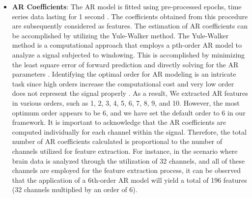 \begin{itemize}
\item \textbf{\large AR Coefficients}: 
The AR model is fitted using pre-processed epochs, time series data lasting for 1 second \cite{arias2023performance}. The coefficients obtained from this procedure are subsequently considered as features. The estimation of AR coefficients can be accomplished by utilizing the Yule-Walker method. The Yule-Walker method is a computational approach that employs a pth-order AR model to analyze a signal subjected to windowing. This is accomplished by minimizing the least square error of forward prediction and directly solving for the AR parameters \cite{pardey1996review}.
\smallskip
Identifying the optimal order for AR modeling is an intricate task since high orders increase the computational cost and very low order does not represent the signal properly \cite{zhang2017classification}. As a result, We extracted AR features in various orders, such as 1, 2, 3, 4, 5, 6, 7, 8, 9, and 10. However, the most optimum order appears to be 6, and we have set the default order to 6 in our framework. It is important to acknowledge that the AR coefficients are computed individually for each channel within the signal. Therefore, the total number of AR coefficients calculated is proportional to the number of channels utilized for feature extraction. For instance, in the scenario where brain data is analyzed through the utilization of 32 channels, and all of these channels are employed for the feature extraction process, it can be observed that the application of a 6th-order AR model will yield a total of 196 features (32 channels multiplied by an order of 6).  


\end{itemize}
